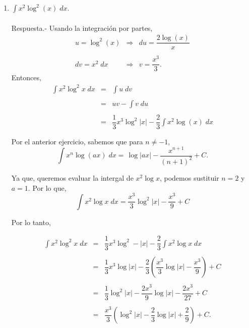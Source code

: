 \begin{enumerate}[\bfseries 1.]
    \item $\displaystyle\int x^2\log^2(x)\; dx$.\\\\
	Respuesta.-\; Usando la integración por partes,
	$$
	\begin{array}{rcl}
	    u=\log^2(x) &\Rightarrow& du=\dfrac{2\log(x)}{x}\\\\
	    dv=x^2\; dx &\Rightarrow& v=\dfrac{x^3}{3}.
	\end{array}
	$$
	Entonces,
	$$
	\begin{array}{rcl}
	    \displaystyle\int x^2\log^2 x\; dx &=& \displaystyle\int u\; dv\\\\
					       &=& uv-\displaystyle\int v\; du\\\\
					       &=& \dfrac{1}{3}x^3\log^2|x|-\dfrac{2}{3}\displaystyle\int x^2\log(x)\; dx\\\\
	\end{array}
	$$
	Por el anterior ejercicio, sabemos que para $n\neq -1$,
	$$\int x^n \log(ax)\; dx = \dfrac{}{}\log |ax|-\dfrac{x^{n+1}}{(n+1)^2}+C.$$

	Ya que, queremos evaluar la intergal de $x^2\log x$, podemos sustituir $n=2$ y $a=1$. Por lo que,
	$$\int x^2\log x\; dx = \dfrac{x^3}{3}\log^2|x|-\dfrac{x^3}{9}+C$$

	Por lo tanto,

	$$
	\begin{array}{rcl}
	    \displaystyle\int x^2\log^2 x\; dx &=& \dfrac{1}{3}x^3\log^2-|x| - \dfrac{2}{3}\int x^2\log x\; dx\\\\\
					       &=& \dfrac{1}{3}x^3\log |x| - \dfrac{2}{3}\left(\dfrac{x^3}{3}\log |x| - \dfrac{x^3}{9}\right)+C\\\\
					       &=& \dfrac{1}{3}\log^2|x|-\dfrac{2x^3}{9}\log |x| -\dfrac{2x^3}{27}+C\\\\
					       &=& \dfrac{x^3}{3}\left(\log^2|x|-\dfrac{2}{3}\log|x|+\dfrac{2}{9}\right)+C.
	\end{array}
	$$
	\vspace{.5cm}



\end{enumerate}
